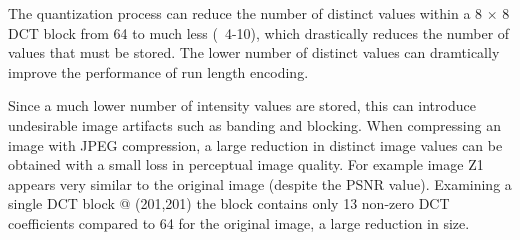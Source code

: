 The quantization process can reduce the number of distinct values within a 8 $\times$ 8 DCT block from 64 to much less (~4-10), which drastically reduces the number of values that must be stored. The lower number of distinct values can dramtically improve the performance of run length encoding.

Since a much lower number of intensity values are stored, this can introduce undesirable image artifacts such as banding and blocking. When compressing an image with JPEG compression, a large reduction in distinct image values can be obtained with a small loss in perceptual image quality. For example image Z1 appears very similar to the original image (despite the PSNR value). Examining a single DCT block @ (201,201) the block contains only 13 non-zero DCT coefficients compared to 64 for the original image, a large reduction in size.

\begin{figure}[ht]
\centering

\end{figure}

